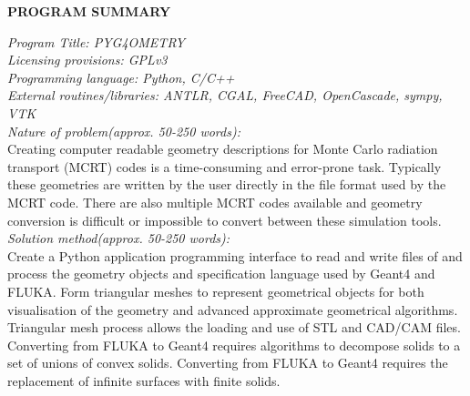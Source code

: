 \documentclass[final,5p,times,twocolumn]{elsarticle}
\begin{document}
{\bf PROGRAM SUMMARY}

\begin{small}
\noindent
{\em Program Title: PYG4OMETRY }                                         		\\
{\em Licensing provisions: GPLv3 }							\\
{\em Programming language: Python, C/C++}                         		\\
{\em External routines/libraries: ANTLR, CGAL, FreeCAD, OpenCascade, sympy, VTK}           	\\


{\em Nature of problem(approx. 50-250 words):}\\
Creating computer readable geometry descriptions for Monte Carlo radiation transport (MCRT) codes is a time-consuming and error-prone task. 
Typically these geometries are written by the user directly in the file format used by the MCRT code. There are also multiple MCRT codes 
available and geometry conversion is difficult or impossible to convert between these simulation tools. 
\\
{\em Solution method(approx. 50-250 words):}\\
Create a Python application programming interface to read and write files of and process the geometry objects and specification 
language used by Geant4 and FLUKA. Form triangular meshes to represent geometrical objects for both visualisation of the 
geometry and advanced approximate geometrical algorithms. Triangular mesh process allows the loading and use of STL and CAD/CAM 
files. Converting from FLUKA to Geant4 requires algorithms to decompose solids to a set of unions of convex solids. Converting from 
FLUKA to Geant4 requires the replacement of infinite surfaces with finite solids. 
 

\end{small}
\end{document}
